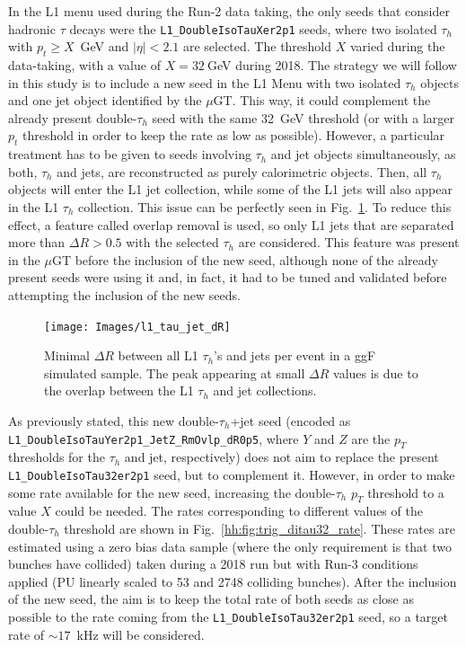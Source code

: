 \documentclass[../main.tex]{subfiles}
\begin{document}
In the L1 menu used during the Run-2 data taking, the only seeds that consider hadronic $\tau$ decays were the \texttt{L1\_DoubleIsoTauXer2p1} seeds, where two isolated $\tau_h$ with $p_t\geq X$~GeV and $|\eta|<2.1$ are selected. The threshold $X$ varied during the data-taking, with a value of $X=32~$GeV during 2018. The strategy we will follow in this study is to include a new seed in the L1 Menu with two isolated $\tau_h$ objects and one jet object identified by the $\mu$GT. This way, it could complement the already present double-$\tau_h$ seed with the same 32~GeV threshold (or with a larger $p_t$ threshold in order to keep the rate as low as possible). However, a particular treatment has to be given to seeds involving $\tau_h$ and jet objects simultaneously, as both, $\tau_h$ and jets, are reconstructed as purely calorimetric objects. Then, all $\tau_h$ objects will enter the L1 jet collection, while some of the L1 jets will also appear in the L1 $\tau_h$ collection. This issue can be perfectly seen in Fig.~\ref{hh:fig:l1_tau_jet_dR}. To reduce this effect, a feature called overlap removal \cite{intro:l1_13tev} is used, so only L1 jets that are separated more than $\Delta R>0.5$ with the selected $\tau_h$ are considered. This feature was present in the $\mu$GT before the inclusion of the new seed, although none of the already present seeds were using it and, in fact, it had to be tuned and validated before attempting the inclusion of the new seeds.

\begin{figure}[h!]
\begin{center}
\texttt{[image: Images/l1\_tau\_jet\_dR]}
\end{center}
\caption{Minimal $\Delta R$ between all L1 $\tau_h$'s and jets per event in a \htt{} ggF simulated sample. The peak appearing at small $\Delta R$ values is due to the overlap between the L1 $\tau_h$ and jet collections.}
\label{hh:fig:l1_tau_jet_dR}
\end{figure}

As previously stated, this new double-$\tau_h$+jet seed (encoded as \texttt{L1\_Double\-IsoTauY\-er2p1\-\_JetZ\_RmOvlp\_dR0p5}, where $Y$ and $Z$ are the $p_T$ thresholds for the $\tau_h$ and jet, respectively) does not aim to replace the present \texttt{L1\_Double\-Iso\-Tau32er2p1} seed, but to complement it. However, in order to make some rate available for the new seed, increasing the double-$\tau_h$ $p_T$ threshold to a value $X$ could be needed. The rates corresponding to different values of the double-$\tau_h$ threshold are shown in Fig.~\ref{hh:fig:trig_ditau32_rate}. These rates are estimated using a zero bias data sample (where the only requirement is that two bunches have collided) taken during a 2018 run but with Run-3 conditions applied (PU linearly scaled to 53 and 2748 colliding bunches). After the inclusion of the new seed, the aim is to keep the total rate of both seeds as close as possible to the rate coming from the \texttt{L1\_Double\-Iso\-Tau32er2p1} seed, so a target rate of $\sim17$~kHz will be considered.
\end{document}
